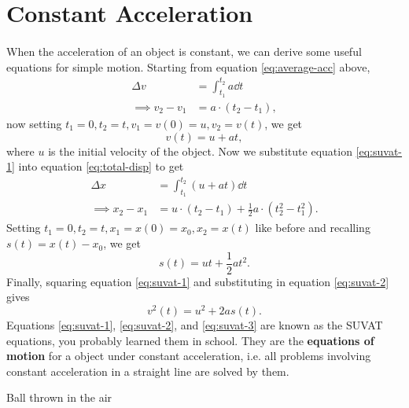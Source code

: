 \documentclass[../classical_mechanics.tex]{subfiles}
\begin{document}
    \section{Constant Acceleration}\label{sec:constant-acceleration}
        \paragraph{}
        When the acceleration of an object is constant, we can derive some useful equations for simple motion.
        Starting from equation \ref{eq:average-acc} above,
        \begin{align}
            \Delta v&=\int_{t_1}^{t_2}a\dd{t}\\
            \implies v_2-v_1&=a\cdot(t_2-t_1),
        \end{align}
        now setting $t_1=0,t_2=t,v_1=v(0)=u,v_2=v(t)$, we get
        \begin{equation}\label{eq:suvat-1}
            v(t)=u+at,
        \end{equation}
        where $u$ is the initial velocity of the object.
        Now we substitute equation \ref{eq:suvat-1} into equation \ref{eq:total-disp} to get
        \begin{align}
            \Delta x&=\int_{t_1}^{t_2}(u+at)\dd{t}\\
            \implies x_2-x_1&=u\cdot(t_2-t_1)+\frac{1}{2}a\cdot(t_2^2-t_1^2).
        \end{align}
        Setting $t_1=0,t_2=t,x_1=x(0)=x_0,x_2=x(t)$ like before and recalling $s(t)=x(t)-x_0$, we get
        \begin{equation}\label{eq:suvat-2}
            s(t)=ut+\frac{1}{2}at^2.
        \end{equation}
        Finally, squaring equation \ref{eq:suvat-1} and substituting in equation \ref{eq:suvat-2} gives
        \begin{equation}\label{eq:suvat-3}
            v^2(t)=u^2+2as(t).
        \end{equation}
        Equations \ref{eq:suvat-1}, \ref{eq:suvat-2}, and \ref{eq:suvat-3} are known as the SUVAT equations, you probably learned them in school.
        They are the \textbf{equations of motion} for a object under constant acceleration, i.e. all problems involving constant acceleration in a straight line are solved by them.
        \begin{example}
            Ball thrown in the air %
        \end{example}
\end{document}
